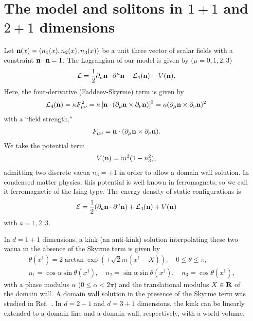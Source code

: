 \documentclass[aps,prd,preprint,
superscriptaddress]{revtex4}
\newcommand {\beq}{\begin{eqnarray}}
\newcommand {\eeq}{\end{eqnarray}}
\newcommand {\1}[1]{\frac{1}{#1}}
\newcommand {\2}[1]{\frac{i}{#1}}
\newcommand {\del}{\partial}
\begin{document}
\section{The model and solitons in $1+1$ and $2+1$ dimensions\label{sec:model}}
\bigskip
Let ${\bf n} (x)= (n_1(x),n_2(x),n_3(x))$  
be a unit three vector of scalar fields 
with a constraint ${\bf n} \cdot {\bf n} = 1$.
The Lagrangian of our model is given by
($\mu=0,1,2,3$)
\beq
&& {\cal L} = \1{2} \del_{\mu}{\bf n}\cdot \del^{\mu} {\bf n} 
 - {\cal L}_4({\bf n})
 - V({\bf n}). \quad  
 \label{eq:Lagrangian}
\eeq
Here, the four-derivative (Faddeev-Skyrme) term  
is given by
\beq
{\cal L}_4 ({\bf n})
= \kappa F_{\mu\nu}^2
= \kappa  \left[{\bf n} \cdot 
 (\partial_{\mu} {\bf n} \times \partial_{\nu} {\bf n} )\right]^2
= \kappa (\partial_{\mu} {\bf n} \times \partial_{\nu} {\bf n} )^2  
\eeq
with a ``field strength," 
\beq
F_{\mu\nu}={\bf n}\cdot 
(\partial_{\mu} {\bf n} \times \partial_{\nu} {\bf n} ). 
\eeq 
We take the potential term \cite{Abraham:1992vb,Weidig:1998ii}
\beq
V({\bf n}) = m^2(1-n_3^2),  \label{eq:pot}
\eeq 
admitting two discrete vacua $n_3=\pm 1$ 
in order to allow a domain wall solution. 
In condensed matter physics, 
this potential is well known in ferromagnets, 
so we call it ferromagnetic of the Ising-type.
The energy density of static configurations is  
\beq
\mathcal{E} =
\1{2} ( \del_a{\bf n}\cdot \del^a {\bf n} ) 
+ {\cal L}_4({\bf n}) + V({\bf n})
\eeq
with $a=1,2,3$. 



In $d=1+1$ dimensions, 
a kink (an anti-kink)  solution interpolating these two vacua in the absence of the Skyrme term 
is given by \cite{Abraham:1992vb,Arai:2002xa,Nitta:2012wi}
\beq
\label{eq:wall} 
&& \theta (x^1) = 2 \arctan \exp (\pm \sqrt 2 m (x^1 -X)),  
  \quad 0 \leq \theta \leq \pi  , \nonumber \\
&&  n_1 = \cos \alpha \sin \theta (x^1) , \quad 
      n_2 = \sin \alpha  \sin \theta (x^1) , \quad
      n_3 = \cos \theta (x^1),
\eeq
with a phase modulus 
$\alpha$ ($0 \leq \alpha < 2\pi$) and 
the translational modulus $X \in {\bf R}$ 
of the domain wall. 
A domain wall solution in the presence of the Skyrme term was studied in Ref.~\cite{Kudryavtsev:1997nw}.
In $d=2+1$ and $d=3+1$ dimensions, the kink can be linearly extended to a domain line and a domain wall, respectively, with a world-volume.
\end{document}

